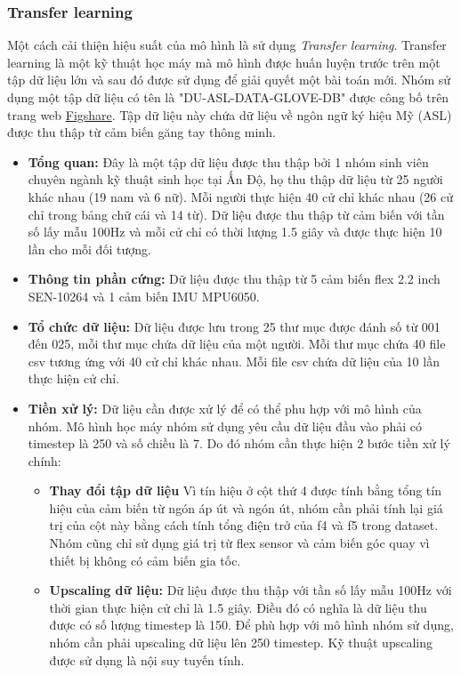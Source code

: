 \subsubsection{Transfer learning}
Một cách cải thiện hiệu suất của mô hình là sử dụng \textit{Transfer learning}. Transfer learning là một kỹ thuật học máy mà mô hình được huấn luyện trước trên một tập dữ liệu lớn và sau đó được sử dụng để giải quyết một bài toán mới. Nhóm sử dụng một tập dữ liệu có tên là "DU-ASL-DATA-GLOVE-DB" được công bố trên trang web \href{https://figshare.com/articles/dataset/ASL-Sensor-Dataglove-Dataset_zip/20031017?file=35776586}{Figshare}. Tập dữ liệu này chứa dữ liệu về ngôn ngữ ký hiệu Mỹ (ASL) được thu thập từ cảm biến găng tay thông minh.

\begin{itemize}
    \item \textbf{Tổng quan:} Đây là một tập dữ liệu được thu thập bởi 1 nhóm sinh viên chuyên ngành kỹ thuật sinh học tại Ấn Độ, họ thu thập dữ liệu từ 25 người khác nhau (19 nam và 6 nữ). Mỗi người thực hiện 40 cử chỉ khác nhau (26 cử chỉ trong bảng chữ cái và 14 từ). Dữ liệu được thu thập từ cảm biến với tần số lấy mẫu 100Hz và mỗi cử chỉ có thời lượng 1.5 giây và được thực hiện 10 lần cho mỗi đối tượng.
    \item \textbf{Thông tin phần cứng:} Dữ liệu được thu thập từ 5 cảm biến flex 2.2 inch SEN-10264 và 1 cảm biến IMU MPU6050.
    \item \textbf{Tổ chức dữ liệu:} Dữ liệu được lưu trong 25 thư mục được đánh số từ 001 đến 025, mỗi thư mục chứa dữ liệu của một người. Mỗi thư mục chứa 40 file csv tương ứng với 40 cử chỉ khác nhau. Mỗi file csv chứa dữ liệu của 10 lần thực hiện cử chỉ. 
    \item \textbf{Tiền xử lý:} Dữ liệu cần được xử lý để có thể phu hợp với mô hình của nhóm. Mô hình học máy nhóm sử dụng yêu cầu dữ liệu đầu vào phải có timestep là 250 và số chiều là 7. Do đó nhóm cần thực hiện 2 bước tiền xử lý chính:
    \begin{itemize}
        \item \textbf{Thay đổi tập dữ liệu} Vì tín hiệu ở cột thứ 4 được tính bằng tổng tín hiệu của cảm biến từ ngón áp út và ngón út, nhóm cần phải tính lại giá trị của cột này bằng cách tính tổng điện trở của f4 và f5 trong dataset. Nhóm cũng chỉ sử dụng giá trị từ flex sensor và cảm biến góc quay vì thiết bị không có cảm biến gia tốc.
        \item \textbf{Upscaling dữ liệu:} Dữ liệu được thu thập với tần số lấy mẫu 100Hz với thời gian thực hiện cử chỉ là 1.5 giây. Điều đó có nghĩa là dữ liệu thu được có số lượng timestep là 150. Để phù hợp với mô hình nhóm sử dụng, nhóm cần phải upscaling dữ liệu lên 250 timestep. Kỹ thuật upscaling được sử dụng là nội suy tuyến tính.

\end{itemize}
\end{itemize}
